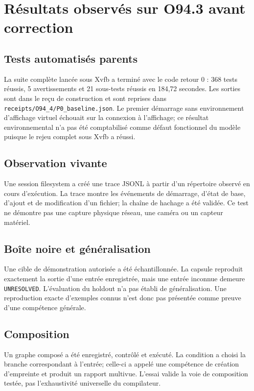 \documentclass[11pt,a4paper]{article}
\begin{document}
\section{Résultats observés sur O94.3 avant correction}
\subsection{Tests automatisés parents}
La suite complète lancée sous Xvfb a terminé avec le code retour 0 : 368 tests réussis, 5 avertissements et 21 sous-tests réussis en 184,72 secondes. Les sorties sont dans le reçu de construction et sont reprises dans \texttt{receipts/O94\_4/P0\_baseline.json}. Le premier démarrage sans environnement d'affichage virtuel échouait sur la connexion à l'affichage; ce résultat environnemental n'a pas été comptabilisé comme défaut fonctionnel du modèle puisque le rejeu complet sous Xvfb a réussi.

\subsection{Observation vivante}
Une session filesystem a créé une trace JSONL à partir d'un répertoire observé en cours d'exécution. La trace montre les événements de démarrage, d'état de base, d'ajout et de modification d'un fichier; la chaîne de hachage a été validée. Ce test ne démontre pas une capture physique réseau, une caméra ou un capteur matériel.

\subsection{Boîte noire et généralisation}
Une cible de démonstration autorisée a été échantillonnée. La capsule reproduit exactement la sortie d'une entrée enregistrée, mais une entrée inconnue demeure \texttt{UNRESOLVED}. L'évaluation du holdout n'a pas établi de généralisation. Une reproduction exacte d'exemples connus n'est donc pas présentée comme preuve d'une compétence générale.

\subsection{Composition}
Un graphe composé a été enregistré, contrôlé et exécuté. La condition a choisi la branche correspondant à l'entrée; celle-ci a appelé une compétence de création d'empreinte et produit un rapport multivue. L'essai valide la voie de composition testée, pas l'exhaustivité universelle du compilateur.
\end{document}
